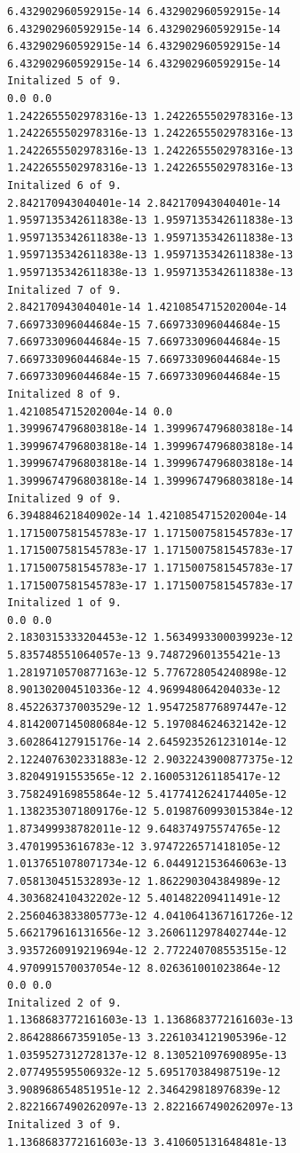 \documentclass[11pt]{article}
\begin{document}
\begin{Verbatim}[commandchars=\\\{\}]
6.432902960592915e-14 6.432902960592915e-14
6.432902960592915e-14 6.432902960592915e-14
6.432902960592915e-14 6.432902960592915e-14
6.432902960592915e-14 6.432902960592915e-14
Initalized 5 of 9.
0.0 0.0
1.2422655502978316e-13 1.2422655502978316e-13
1.2422655502978316e-13 1.2422655502978316e-13
1.2422655502978316e-13 1.2422655502978316e-13
1.2422655502978316e-13 1.2422655502978316e-13
Initalized 6 of 9.
2.842170943040401e-14 2.842170943040401e-14
1.9597135342611838e-13 1.9597135342611838e-13
1.9597135342611838e-13 1.9597135342611838e-13
1.9597135342611838e-13 1.9597135342611838e-13
1.9597135342611838e-13 1.9597135342611838e-13
Initalized 7 of 9.
2.842170943040401e-14 1.4210854715202004e-14
7.669733096044684e-15 7.669733096044684e-15
7.669733096044684e-15 7.669733096044684e-15
7.669733096044684e-15 7.669733096044684e-15
7.669733096044684e-15 7.669733096044684e-15
Initalized 8 of 9.
1.4210854715202004e-14 0.0
1.3999674796803818e-14 1.3999674796803818e-14
1.3999674796803818e-14 1.3999674796803818e-14
1.3999674796803818e-14 1.3999674796803818e-14
1.3999674796803818e-14 1.3999674796803818e-14
Initalized 9 of 9.
6.394884621840902e-14 1.4210854715202004e-14
1.1715007581545783e-17 1.1715007581545783e-17
1.1715007581545783e-17 1.1715007581545783e-17
1.1715007581545783e-17 1.1715007581545783e-17
1.1715007581545783e-17 1.1715007581545783e-17
Initalized 1 of 9.
0.0 0.0
2.1830315333204453e-12 1.5634993300039923e-12
5.835748551064057e-13 9.748729601355421e-13
1.2819710570877163e-12 5.776728054240898e-12
8.901302004510336e-12 4.969948064204033e-12
8.452263737003529e-12 1.9547258776897447e-12
4.8142007145080684e-12 5.197084624632142e-12
3.602864127915176e-14 2.6459235261231014e-12
2.1224076302331883e-12 2.9032243900877375e-12
3.82049191553565e-12 2.1600531261185417e-12
3.758249169855864e-12 5.4177412624174405e-12
1.1382353071809176e-12 5.0198760993015384e-12
1.873499938782011e-12 9.648374975574765e-12
3.47019953616783e-12 3.9747226571418105e-12
1.0137651078071734e-12 6.044912153646063e-13
7.058130451532893e-12 1.862290304384989e-12
4.303682410432202e-12 5.401482209411491e-12
2.2560463833805773e-12 4.0410641367161726e-12
5.662179616131656e-12 3.2606112978402744e-12
3.9357260919219694e-12 2.772240708553515e-12
4.970991570037054e-12 8.026361001023864e-12
0.0 0.0
Initalized 2 of 9.
1.1368683772161603e-13 1.1368683772161603e-13
2.864288667359105e-13 3.2261034121905396e-12
1.0359527312728137e-12 8.130521097690895e-13
2.077495595506932e-12 5.695170384987519e-12
3.908968654851951e-12 2.346429818976839e-12
2.8221667490262097e-13 2.8221667490262097e-13
Initalized 3 of 9.
1.1368683772161603e-13 3.410605131648481e-13

\end{Verbatim}
\end{document}
